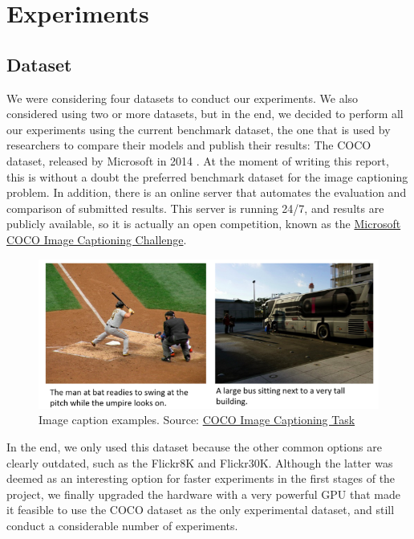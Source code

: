 \chapter{Experiments}
\label{ch:experiments}

\section{Dataset}

We were considering four datasets to conduct our experiments. We also considered using two or more datasets, but in the end, we decided to perform all our experiments using the current benchmark dataset, the one that is used by researchers to compare their models and publish their results: The COCO dataset, released by Microsoft in 2014  \citet{Lin2014}. At the moment of writing this report, this is without a doubt the preferred benchmark dataset for the image captioning problem. In addition, there is an online server that automates the evaluation and comparison of submitted results. This server is running 24/7, and results are publicly available, so it is actually an open competition, known as the \href{https://competitions.codalab.org/competitions/3221}{Microsoft COCO Image Captioning Challenge}. 

\begin{figure}[hpt]
    \centering
    \includegraphics[scale=0.5]{images/ch5/captions-splash.jpg}
    \caption{Image caption examples. Source: \href{http://cocodataset.org/}{COCO Image Captioning Task}}
    \label{fig:caption-example}
\end{figure}

In the end, we only used this dataset because the other common options are clearly outdated, such as the Flickr8K and Flickr30K. Although the latter was deemed as an interesting option for faster experiments in the first stages of the project, we finally upgraded the hardware with a very powerful GPU that made it feasible to use the COCO dataset as the only experimental dataset, and still conduct a considerable number of experiments.

